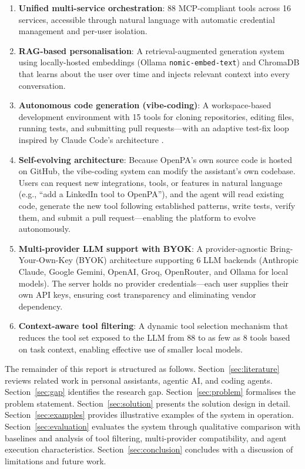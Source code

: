 \begin{enumerate}[leftmargin=*]
  \item \textbf{Unified multi-service orchestration}: 88 MCP-compliant tools across 16 services, accessible through natural language with automatic credential management and per-user isolation.

  \item \textbf{RAG-based personalisation}: A retrieval-augmented generation system using locally-hosted embeddings (Ollama \texttt{nomic-embed-text}) and ChromaDB \cite{chromadb2024} that learns about the user over time and injects relevant context into every conversation.

  \item \textbf{Autonomous code generation (vibe-coding)}: A workspace-based development environment with 15 tools for cloning repositories, editing files, running tests, and submitting pull requests---with an adaptive test-fix loop inspired by Claude Code's architecture \cite{anthropic2025claudecode}.

  \item \textbf{Self-evolving architecture}: Because OpenPA's own source code is hosted on GitHub, the vibe-coding system can modify the assistant's own codebase. Users can request new integrations, tools, or features in natural language (e.g., ``add a LinkedIn tool to OpenPA''), and the agent will read existing code, generate the new tool following established patterns, write tests, verify them, and submit a pull request---enabling the platform to evolve autonomously.

  \item \textbf{Multi-provider LLM support with BYOK}: A provider-agnostic Bring-Your-Own-Key (BYOK) architecture supporting 6 LLM backends (Anthropic Claude, Google Gemini, OpenAI, Groq, OpenRouter, and Ollama for local models). The server holds no provider credentials---each user supplies their own API keys, ensuring cost transparency and eliminating vendor dependency.

  \item \textbf{Context-aware tool filtering}: A dynamic tool selection mechanism that reduces the tool set exposed to the LLM from 88 to as few as 8 tools based on task context, enabling effective use of smaller local models.
\end{enumerate}

The remainder of this report is structured as follows. Section~\ref{sec:literature} reviews related work in personal assistants, agentic AI, and coding agents. Section~\ref{sec:gap} identifies the research gap. Section~\ref{sec:problem} formalises the problem statement. Section~\ref{sec:solution} presents the solution design in detail. Section~\ref{sec:examples} provides illustrative examples of the system in operation. Section~\ref{sec:evaluation} evaluates the system through qualitative comparison with baselines and analysis of tool filtering, multi-provider compatibility, and agent execution characteristics. Section~\ref{sec:conclusion} concludes with a discussion of limitations and future work.
